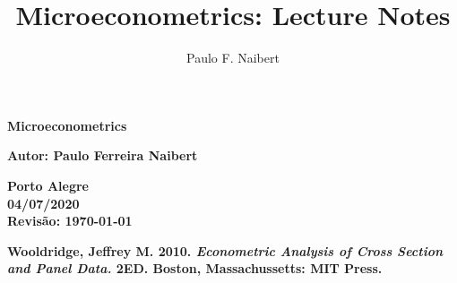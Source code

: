 \documentclass[11pt, oneside, a4paper, article]{article}
\numberwithin{equation}{section}
\begin{document}
\title{Microeconometrics: Lecture Notes \cite{wool-2010}}
\author{Paulo F. Naibert}

\thispagestyle{empty}

\begin{center}
\textbf{Microeconometrics}

\vfill
\textbf{\thetitle}

\vfill
\textbf{Autor: Paulo Ferreira Naibert } 


\end{center}

\vfill

\begin{center}
\textbf{Porto Alegre \\ 04/07/2020 \\ Revisão: \today}
\end{center}

\clearpage
{}


\begin{center}
\textbf{Wooldridge, Jeffrey M. 2010. \textit{Econometric Analysis of Cross Section and Panel Data.} 2ED. Boston, Massachussetts: MIT Press.}
\end{center}

\end{document}
